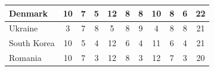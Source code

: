 \documentclass[12pt]{article}  %
\begin{document}
\begin{subappendices}
\begin{longtable}{|l|c|c|c|c|c|c|c|c|c|c|}
	\hline
	Denmark                                                        & 10                                                                     & 7                                                                      & 5                                                                      & 12                                                                     & 8                                                                      & 8                                                                      & 10                        & 8                           & 6                           & 22                          \\ 
	\hline
	Ukraine                                                        & 3                                                                      & 7                                                                      & 8                                                                      & 5                                                                      & 8                                                                      & 9                                                                      & 4                         & 8                           & 8                           & 21                          \\ 
	\hline
	South Korea                                                    & 10                                                                     & 5                                                                      & 4                                                                      & 12                                                                     & 6                                                                      & 4                                                                      & 11                        & 6                           & 4                           & 21                          \\ 
	\hline
	Romania                                                        & 10                                                                     & 7                                                                      & 3                                                                      & 12                                                                     & 8                                                                      & 3                                                                      & 12                        & 7                           & 3                           & 20                          \\ 

\end{longtable}
\end{subappendices}
\end{document}
